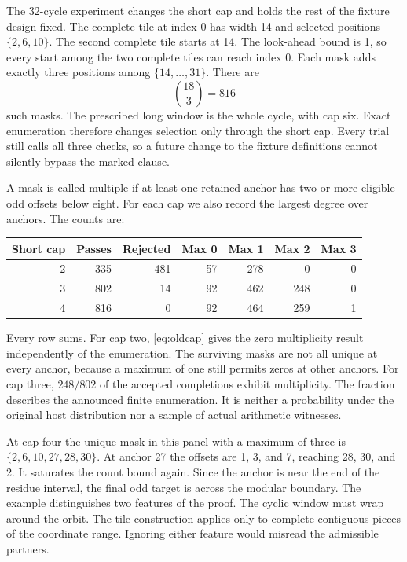 \documentclass[12pt,letterpaper]{article}
\begin{document}
The 32-cycle experiment changes the short cap and holds the rest of the fixture design fixed. The complete tile at index 0 has width 14 and selected positions $\{2,6,10\}$. The second complete tile starts at 14. The look-ahead bound is 1, so every start among the two complete tiles can reach index 0. Each mask adds exactly three positions among $\{14,\ldots,31\}$. There are
\[
                         \binom{18}{3}=816
\]
such masks. The prescribed long window is the whole cycle, with cap six. Exact enumeration therefore changes selection only through the short cap. Every trial still calls all three checks, so a future change to the fixture definitions cannot silently bypass the marked clause.

A mask is called multiple if at least one retained anchor has two or more eligible odd offsets below eight. For each cap we also record the largest degree over anchors. The counts are:
\begin{center}
\begin{tabular}{@{}rrrrrrr@{}}
\toprule
Short cap & Passes & Rejected & Max 0 & Max 1 & Max 2 & Max 3\\
\midrule
2 & 335 & 481 & 57 & 278 & 0 & 0\\
3 & 802 & 14 & 92 & 462 & 248 & 0\\
4 & 816 & 0 & 92 & 464 & 259 & 1\\
\bottomrule
\end{tabular}
\end{center}
Every row sums. For cap two, \eqref{eq:oldcap} gives the zero multiplicity result independently of the enumeration. The surviving masks are not all unique at every anchor, because a maximum of one still permits zeros at other anchors. For cap three, $248/802$ of the accepted completions exhibit multiplicity. The fraction describes the announced finite enumeration. It is neither a probability under the original host distribution nor a sample of actual arithmetic witnesses.

At cap four the unique mask in this panel with a maximum of three is $\{2,6,10,27,28,30\}$. At anchor 27 the offsets are 1, 3, and 7, reaching 28, 30, and 2. It saturates the count bound again. Since the anchor is near the end of the residue interval, the final odd target is across the modular boundary. The example distinguishes two features of the proof. The cyclic window must wrap around the orbit. The tile construction applies only to complete contiguous pieces of the coordinate range. Ignoring either feature would misread the admissible partners.
\end{document}
